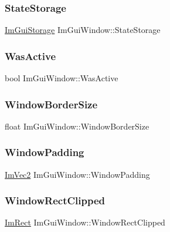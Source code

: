 \subsubsection{\texorpdfstring{State\+Storage}{StateStorage}}
{\footnotesize\ttfamily \hyperlink{struct_im_gui_storage}{Im\+Gui\+Storage} Im\+Gui\+Window\+::\+State\+Storage}

\hypertarget{struct_im_gui_window_ab346ec3a2f305948af05ec1871610a8f}{}\label{struct_im_gui_window_ab346ec3a2f305948af05ec1871610a8f} 
\subsubsection{\texorpdfstring{Was\+Active}{WasActive}}
{\footnotesize\ttfamily bool Im\+Gui\+Window\+::\+Was\+Active}

\hypertarget{struct_im_gui_window_ad51248766b9a815ce20b0d11e13b42b0}{}\label{struct_im_gui_window_ad51248766b9a815ce20b0d11e13b42b0} 
\subsubsection{\texorpdfstring{Window\+Border\+Size}{WindowBorderSize}}
{\footnotesize\ttfamily float Im\+Gui\+Window\+::\+Window\+Border\+Size}

\hypertarget{struct_im_gui_window_a538d3d70ad8f71a4ec58a6a0560b2f02}{}\label{struct_im_gui_window_a538d3d70ad8f71a4ec58a6a0560b2f02} 
\subsubsection{\texorpdfstring{Window\+Padding}{WindowPadding}}
{\footnotesize\ttfamily \hyperlink{struct_im_vec2}{Im\+Vec2} Im\+Gui\+Window\+::\+Window\+Padding}

\hypertarget{struct_im_gui_window_ae0af9ff6c93baad6848143dd9d742ddd}{}\label{struct_im_gui_window_ae0af9ff6c93baad6848143dd9d742ddd} 
\subsubsection{\texorpdfstring{Window\+Rect\+Clipped}{WindowRectClipped}}
{\footnotesize\ttfamily \hyperlink{struct_im_rect}{Im\+Rect} Im\+Gui\+Window\+::\+Window\+Rect\+Clipped}

